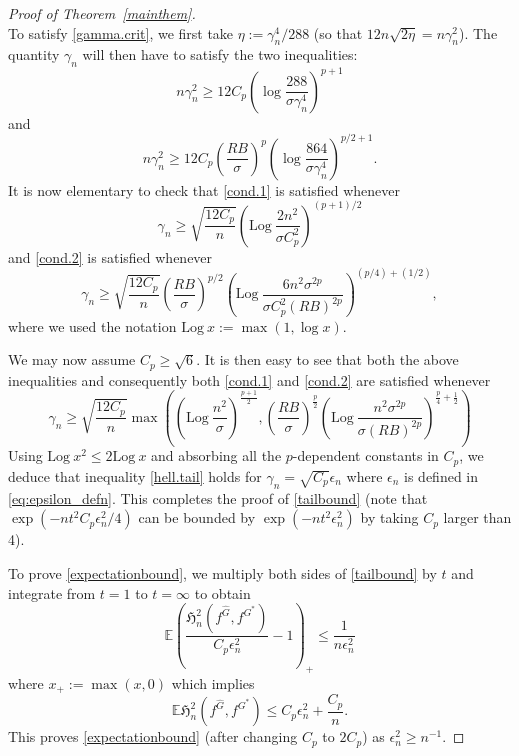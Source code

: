 \documentclass[11pt]{article}
\numberwithin{equation}{section}
\newcommand{\Log}{\mathrm{Log}~}
\newcommand{\E}{\mathbb{E}}
\begin{document}
\begin{appendices}
\begin{proof}[Proof of Theorem~\ref{mainthem}]
\begin{equation}
\end{equation}
To satisfy \eqref{gamma.crit}, we first take $\eta := \gamma_n^4/288$ (so that $12 n \sqrt{2 \eta} = n \gamma_n^2$). The quantity $\gamma_n$  will then have to satisfy the two inequalities:
\begin{equation}\label{cond.1}
  n \gamma_n^2 \geq 12 C_p \left(\log \frac{288}{\sigma \gamma_n^4} \right)^{p+1} 
\end{equation}
and
\begin{equation}\label{cond.2}
  n \gamma_n^2 \geq 12 C_p \left(\frac{RB}{\sigma} \right)^{p} \left(\log \frac{864}{\sigma \gamma_n^4} \right)^{p/2 + 1}. 
\end{equation}
It is now elementary to check that \eqref{cond.1} is satisfied whenever
\begin{equation*}
  \gamma_n \geq \sqrt{\frac{12C_p}{n}} \left(\Log  \frac{2n^2}{\sigma C_p^2} \right)^{(p+1)/2} 
\end{equation*}
and \eqref{cond.2} is satisfied whenever
\begin{equation*}
  \gamma_n \geq \sqrt{\frac{12 C_p}{n}} \left(\frac{R B}{\sigma} \right)^{p/2} \left(\Log \frac{6n^2 \sigma^{2p}}{\sigma C_p^2 (R B)^{2p}} \right)^{(p/4) + (1/2)} ,
\end{equation*}
where we used the notation $\Log x := \max(1, \log x)$.

We may now assume $C_p \geq \sqrt{6}$. It is then easy to see that both the above inequalities and consequently both \eqref{cond.1} and \eqref{cond.2} are satisfied whenever  
\begin{equation*}
  \gamma_n \geq \sqrt{\frac{12 C_p}{n}} \max \left(\left(\Log  \frac{n^2}{\sigma} \right)^{\frac{p+1}{2}} , \left(\frac{R B}{\sigma} \right)^{\frac{p}{2}} \left(\Log \frac{n^2 \sigma^{2p}}{\sigma (R B)^{2p}} \right)^{\frac{p}{4} + \frac{1}{2}}  \right) 
\end{equation*}
Using $\Log x^2 \leq 2 \Log x$ and absorbing all the $p$-dependent constants in $C_p$, we deduce that inequality \eqref{hell.tail}  holds for  $\gamma_n = \sqrt{C_p} \epsilon_n$ where $\epsilon_n$ is defined in \eqref{eq:epsilon_defn}. This completes the proof of \eqref{tailbound} (note that $\exp(-nt^2C_p\epsilon_n^2/4)$ can be bounded by $\exp(-nt^2\epsilon_n^2)$ by taking $C_p$ larger than 4). 

To prove \eqref{expectationbound}, we multiply both sides of \eqref{tailbound} by $t$ and integrate from $t = 1$ to $t = \infty$ to obtain
\begin{equation*}
  \E \left(\frac{\mathfrak{H}_n^2(f^{\hat G}, f^{G^*})}{C_p \epsilon_n^2} - 1 \right)_+ \leq \frac{1}{n\epsilon_n^2} 
\end{equation*}
where $x_+ := \max(x, 0)$ which implies
\begin{equation*}
  \E \mathfrak{H}_n^2(f^{\hat G}, f^{G^*}) \leq C_p \epsilon_n^2 + \frac{C_p}{n}. 
\end{equation*}
This proves \eqref{expectationbound} (after changing $C_p$ to $2 C_p$) as $\epsilon_n^2 \geq n^{-1}$.  
\end{proof}



\end{appendices}
\end{document}
